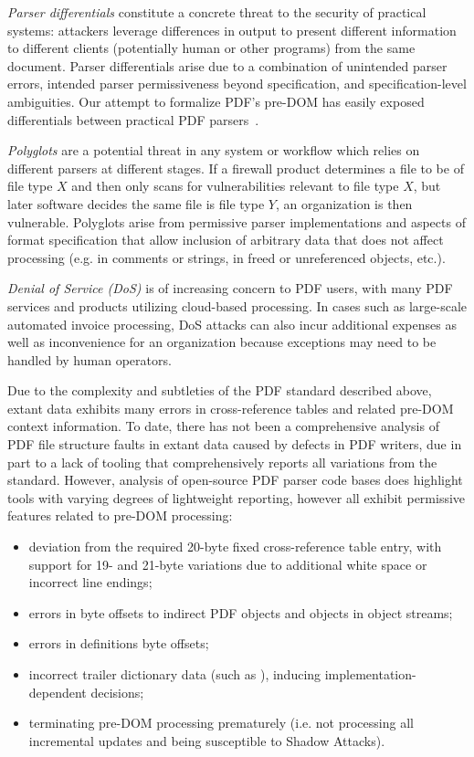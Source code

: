 \emph{Parser differentials} constitute a concrete threat to the
security of practical systems: attackers leverage differences in
output to present different information to different clients
(potentially human or other programs) from the same document.
%
Parser differentials arise due to a combination of unintended parser
errors, intended parser permissiveness beyond specification, and
specification-level ambiguities.
%
Our attempt to formalize PDF's pre-DOM has easily exposed
differentials between practical PDF parsers~\cite{dualStartXref}.

\emph{Polyglots} are a potential threat in any system or workflow
which relies on different parsers at different stages. If a firewall
product determines a file to be of file type $X$ and then only scans
for vulnerabilities relevant to file type $X$, but later software
decides the same file is file type $Y$, an organization is then
vulnerable.
%
Polyglots arise from permissive parser implementations and aspects of
format specification that allow inclusion of arbitrary data that does
not affect processing (e.g. in comments or strings, in freed or
unreferenced objects, etc.).

\emph{Denial of Service (DoS)} is of increasing concern to PDF users,
with many PDF services and products utilizing cloud-based processing.
%
In cases such as large-scale automated invoice processing, DoS attacks
can also incur additional expenses as well as inconvenience for an
organization because exceptions may need to be handled by human
operators.

Due to the complexity and subtleties of the PDF standard described
above, extant data exhibits many errors in cross-reference tables and
related pre-DOM context information.
%
To date, there has not been a comprehensive analysis of PDF file
structure faults in extant data caused by defects in PDF writers, due
in part to a lack of tooling that comprehensively reports all
variations from the standard.
%
However, analysis of open-source PDF parser code bases does highlight
tools with varying degrees of lightweight reporting, however all
exhibit permissive features related to pre-DOM processing:
%
\begin{itemize}
\item deviation from the required 20-byte fixed cross-reference table
  entry, with support for 19- and 21-byte variations due to additional
  white space or incorrect line endings;
\item errors in byte offsets to indirect PDF objects and objects in
  object streams;
\item errors in definitions  byte offsets;
\item incorrect trailer dictionary data (such as ),
  inducing implementation-dependent decisions;
\item terminating pre-DOM processing prematurely (i.e. not processing
  all incremental updates and being susceptible to Shadow Attacks).
\end{itemize}
